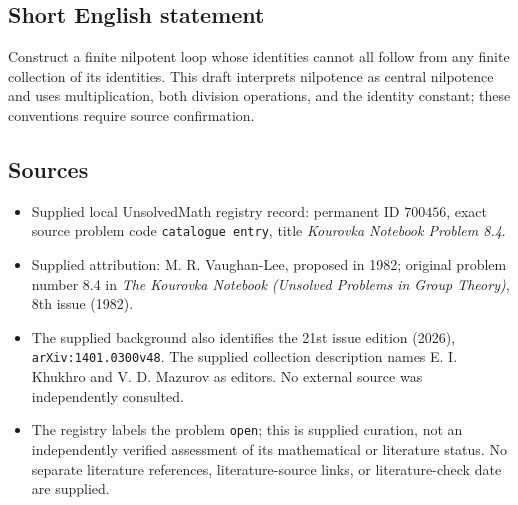 \documentclass[11pt]{article}
\begin{document}
\subsection{Short English statement}
Construct a finite nilpotent loop whose identities cannot all follow from any finite collection of its identities. This draft interprets nilpotence as central nilpotence and uses multiplication, both division operations, and the identity constant; these conventions require source confirmation.
\subsection{Sources}
\begin{itemize}
\item Supplied local UnsolvedMath registry record: permanent ID \(700456\), exact source problem code \texttt{catalogue entry}, title \emph{Kourovka Notebook Problem 8.4}.
\item Supplied attribution: M. R. Vaughan-Lee, proposed in 1982; original problem number 8.4 in \emph{The Kourovka Notebook (Unsolved Problems in Group Theory)}, 8th issue (1982).
\item The supplied background also identifies the 21st issue edition (2026), \texttt{arXiv:1401.0300v48}. The supplied collection description names E. I. Khukhro and V. D. Mazurov as editors. No external source was independently consulted.
\item The registry labels the problem \texttt{open}; this is supplied curation, not an independently verified assessment of its mathematical or literature status. No separate literature references, literature-source links, or literature-check date are supplied.
\end{itemize}
\end{document}
